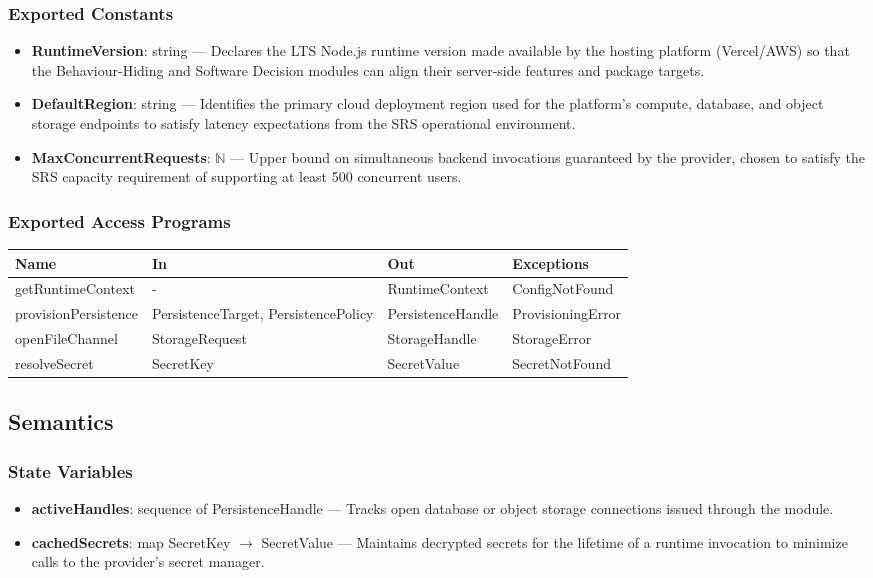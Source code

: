\documentclass[12pt, titlepage]{article}
\begin{document}
\subsubsection{Exported Constants}
\begin{itemize}
  \item \textbf{RuntimeVersion}: string --- Declares the LTS Node.js runtime version made available by the hosting platform (Vercel/AWS) so that the Behaviour-Hiding and Software Decision modules can align their server-side features and package targets.
  \item \textbf{DefaultRegion}: string --- Identifies the primary cloud deployment region used for the platform's compute, database, and object storage endpoints to satisfy latency expectations from the SRS operational environment.
  \item \textbf{MaxConcurrentRequests}: $\mathbb{N}$ --- Upper bound on simultaneous backend invocations guaranteed by the provider, chosen to satisfy the SRS capacity requirement of supporting at least 500 concurrent users.
\end{itemize}

\subsubsection{Exported Access Programs}

\begin{center}
\begin{tabular}{p{3.5cm} p{4.5cm} p{4.5cm} p{3cm}}
\toprule
\textbf{Name} & \textbf{In} & \textbf{Out} & \textbf{Exceptions} \\
\midrule
getRuntimeContext & - & RuntimeContext & ConfigNotFound \\
provisionPersistence & PersistenceTarget, PersistencePolicy & PersistenceHandle & ProvisioningError \\
openFileChannel & StorageRequest & StorageHandle & StorageError \\
resolveSecret & SecretKey & SecretValue & SecretNotFound \\
\bottomrule
\end{tabular}
\end{center}

\subsection{Semantics}

\subsubsection{State Variables}
\begin{itemize}
  \item \textbf{activeHandles}: sequence of PersistenceHandle --- Tracks open database or object storage connections issued through the module.
  \item \textbf{cachedSecrets}: map SecretKey $\rightarrow$ SecretValue --- Maintains decrypted secrets for the lifetime of a runtime invocation to minimize calls to the provider's secret manager.
\end{itemize}
\end{document}
